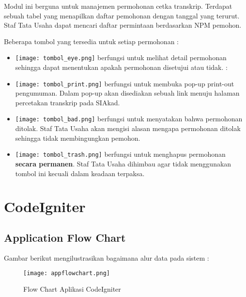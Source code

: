 Modul ini berguna untuk manajemen permohonan cetka transkrip. Terdapat sebuah tabel yang menapilkan daftar pemohonan dengan tanggal yang terurut. Staf Tata Usaha dapat mencari daftar permintaan berdasarkan NPM pemohon.

Beberapa tombol yang tersedia untuk setiap permohonan :

\begin{itemize}
	\item \texttt{[image: tombol\_eye.png]} berfungsi untuk melihat detail permohonan sehingga dapat menentukan apakah permohonan disetujui atau tidak.
	: \item \texttt{[image: tombol\_print.png]} berfungsi untuk membuka pop-up print-out pengumuman. Dalam pop-up akan disediakan sebuah link menuju halaman percetakan transkrip pada SIAkad.
	\item \texttt{[image: tombol\_bad.png]} berfungsi untuk menyatakan bahwa permohonan ditolak. Staf Tata Usaha akan mengisi alasan mengapa permohonan ditolak sehingga tidak membingungkan pemohon.
	\item \texttt{[image: tombol\_trash.png]} berfungsi untuk menghapus permohonan \textbf{secara permanen}. Staf Tata Usaha dihimbau agar tidak menggunakan tombol ini kecuali dalam keadaan terpaksa.
\end{itemize}  

\section{CodeIgniter}

\subsection{Application Flow Chart}
Gambar berikut mengilustrasikan bagaimana alur data pada sistem :

\begin{figure} [H]
	\centering  
	\texttt{[image: appflowchart.png]}  
	\caption{Flow Chart Aplikasi CodeIgniter}
	\label{fig:flowChartCodeIgniter} 
\end{figure}


